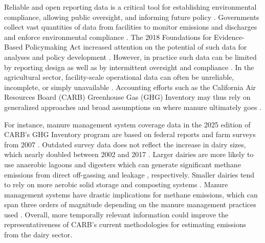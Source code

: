\documentclass{iopjournal}
\begin{document}
Reliable and open reporting data is a critical tool for establishing environmental compliance, allowing public oversight, and informing future policy \cite{Giles_2022}. Governments collect vast quantities of data from facilities to monitor emissions and discharges and enforce environmental compliance \cite{Gray_Shimshack_2011, Giles_2022}. The 2018 Foundations for Evidence-Based Policymaking Act increased attention on the potential of such data for analyses and policy development \cite{US_Congress_2019}. However, in practice such data can be limited by reporting design \cite{Bennear_2008} as well as by intermittent oversight and compliance \cite{Robertson_2026}. In the agricultural sector, facility-scale operational data can often be unreliable, incomplete, or simply unavailable \cite{Marklein_2021, Miller_2020, ELF_v_SWRCB_2023, Handan-Nader_Ho_2019, Robertson_2026}. Accounting efforts such as the California Air Resources Board (CARB) Greenhouse Gas (GHG) Inventory may thus rely on generalized approaches and broad assumptions on where manure ultimately goes \cite{CARB_2000_2023_GHG_Methods}. 

For instance, manure management system coverage data in the 2025 edition of CARB's GHG Inventory program \cite{CARB_2000-2023_GHG} are based on federal reports and farm surveys from 2007 \cite{EPA_Inventory_Annexes_2013}. Outdated survey data does not reflect the increase in dairy sizes, which nearly doubled between 2002 and 2017 \cite{USDA_2020}. Larger dairies are more likely to use anaerobic lagoons \cite{EPA_Inventory_Annexes_2013} and digesters \cite{Cowley_2018} which can generate significant methane emissions from direct off-gassing \cite{Marklein_2021} and leakage \cite{Valdez_2026}, respectively. Smaller dairies tend to rely on more aerobic solid storage and composting systems \cite{EPA_Inventory_Annexes_2013, Owen_2015}. Manure management systems have drastic implications for methane emissions, which can span three orders of magnitude depending on the manure management practices used \cite{Marklein_2021, El_Mashad_2023, Naranjo_2020}. Overall, more temporally relevant information could improve the representativeness of CARB's current methodologies for estimating emissions from the dairy sector.
\end{document}
